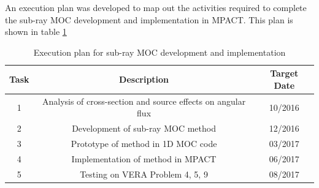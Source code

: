 An execution plan was developed to map out the activities required to complete the sub-ray MOC development and implementation in MPACT.  This plan is shown in table \ref{t:subrayExecutionPlan}

\begin{table}[h]
  \centering
  \caption{Execution plan for sub-ray MOC development and implementation}\label{t:subrayExecutionPlan}
  \begin{tabular}{|c|c|c|}\toprule
    Task & Description & Target Date \\\midrule
    1 & Analysis of cross-section and source effects on angular flux & 10/2016 \\\midrule
    2 & Development of sub-ray MOC method & 12/2016 \\\midrule
    3 & Prototype of method in 1D MOC code & 03/2017 \\\midrule
    4 & Implementation of method in MPACT & 06/2017 \\\midrule
    5 & Testing on VERA Problem 4, 5, 9 & 08/2017 \\\bottomrule
  \end{tabular}
\end{table}